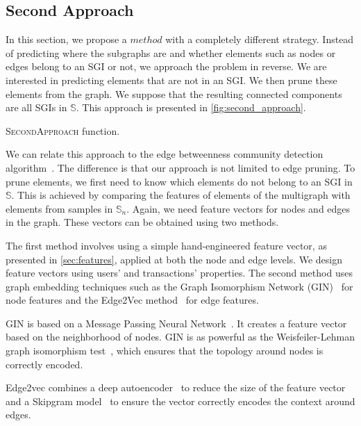 \documentclass{llncs}
\begin{document}
\subsection{Second Approach}\label{sec:second_approach}
In this section, we propose a \(method\) with a completely different strategy.
Instead of predicting where the subgraphs are and whether elements such as nodes or edges belong to an SGI or not, we approach the problem in reverse.
We are interested in predicting elements that are not in an SGI.\@
We then prune these elements from the graph.
We suppose that the resulting connected components are all SGIs in \(\mathbb{S}\).
This approach is presented in \autoref{fig:second_approach}.

\begin{algorithm}[htb!]

\caption{\textsc{SecondApproach} function.}%
\label{fig:second_approach}
\end{algorithm}

We can relate this approach to the edge betweenness community detection algorithm~\cite{Girvan2002}.
The difference is that our approach is not limited to edge pruning.
To prune elements, we first need to know which elements do not belong to an SGI in \(\mathbb{S}\).
This is achieved by comparing the features of elements of the multigraph with elements from samples in \(\mathbb{S}_n\).
Again, we need feature vectors for nodes and edges in the graph.
These vectors can be obtained using two methods.

The first method involves using a simple hand-engineered feature vector, as presented in \autoref{sec:features}, applied at both the node and edge levels.
We design feature vectors using users' and transactions' properties.
The second method uses graph embedding techniques such as the Graph Isomorphism Network (GIN)~\cite{Xu2019} for node features and the Edge2Vec method~\cite{Wang2020} for edge features.

GIN is based on a Message Passing Neural Network~\cite{Kipf2017}.
It creates a feature vector based on the neighborhood of nodes.
GIN is as powerful as the Weisfeiler-Lehman graph isomorphism test~\cite{Weisfeiler1968}, which ensures that the topology around nodes is correctly encoded.

Edge2vec combines a deep autoencoder~\cite{Salakhutdinov2009} to reduce the size of the feature vector and a Skipgram model~\cite{Mikolov2013} to ensure the vector correctly encodes the context around edges.
\end{document}
